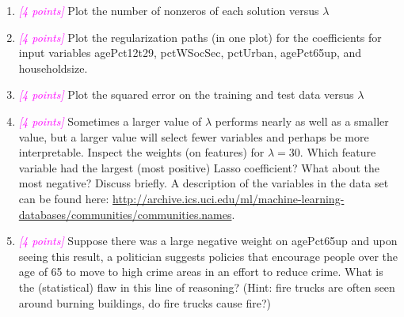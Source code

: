 \documentclass{article}
\newcommand{\1}{\mathbf{1}}
\newcommand{\points}[1]{\small\textcolor{magenta}{\emph{[#1 points]}} \normalsize}
\begin{document}
\begin{enumerate}
    \item \points{4} Plot the number of nonzeros of each solution versus $\lambda$
    \item \points{4} Plot the regularization paths (in one plot) for the coefficients for input variables agePct12t29, pctWSocSec, pctUrban, agePct65up, and householdsize.
    \item \points{4} Plot the squared error on the training and test data versus $\lambda$
    \item \points{4} Sometimes a larger value of $\lambda$ performs nearly as well as a smaller value, but a larger value will select fewer variables and perhaps be more interpretable. Inspect the weights (on features) for $\lambda = 30$. Which feature variable had the largest (most positive) Lasso coefficient? What about the most negative? Discuss briefly. A description of the variables in the data set can be found here: \url{http://archive.ics.uci.edu/ml/machine-learning-databases/communities/communities.names}.
    \item \points{4} Suppose there was a large negative weight on agePct65up and upon seeing this result, a politician suggests policies that encourage people over the age of 65 to move to high crime areas in an effort to reduce crime. What is the (statistical) flaw in this line of reasoning? (Hint:  fire trucks are often seen around burning buildings, do fire trucks cause fire?)
\end{enumerate}



\newpage
\end{document}
